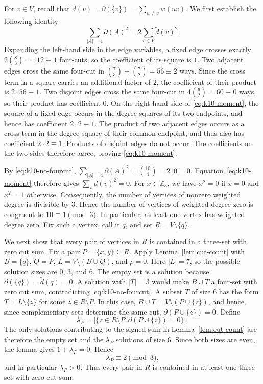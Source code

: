 ﻿\documentclass[11pt]{article}
\numberwithin{equation}{section}
\theoremstyle{remark}
\newcommand{\Z}{\mathbb Z}
\newcommand{\td}{\tilde{d}}
\begin{document}
For $v\in V$, recall that $\td(v)=\partial(\{v\})=\sum_{u\ne v}w(uv)$.  We first establish the following identity
\begin{equation}\label{eq:k10-moment}
    \sum_{|A|=4}\partial(A)^2=2\sum_{v\in V}\td(v)^2.
\end{equation}
Expanding the left-hand side in the edge variables, a fixed edge crosses exactly
\(2\binom{8}{3}=112\equiv 1\)
four-cuts, so the coefficient of its square is \(1\). Two adjacent edges cross the same four-cut in
\(\binom{7}{3}+\binom{7}{2}=56\equiv 2\)
ways. Since the cross term in a square carries an additional factor of \(2\), the coefficient of their product is
\(2\cdot 56\equiv 1.\)
Two disjoint edges cross the same four-cut in
\(4\binom{6}{2}=60\equiv 0\)
ways, so their product has coefficient \(0\).
On the right-hand side of \eqref{eq:k10-moment}, the square of a fixed edge occurs in the degree squares of its two endpoints, and hence has coefficient
\(2\cdot 2\equiv 1.\)
The product of two adjacent edges occurs as a cross term in the degree square of their common endpoint, and thus also has coefficient
\(2\cdot 2\equiv 1.\)
Products of disjoint edges do not occur. The coefficients on the two sides therefore agree, proving \eqref{eq:k10-moment}.

By \eqref{eq:k10-no-fourcut},
\(
\sum_{|A|=4}\partial(A)^2=\binom{10}{4}=210=0.
\)
Equation~\eqref{eq:k10-moment} therefore gives $\sum_v \td(v)^2=0$.  For \(x\in\Z_3\), we have \(x^2=0\) if \(x=0\) and \(x^2=1\) otherwise. Consequently, the number of vertices of nonzero weighted degree is divisible by \(3\). Hence the number of vertices of weighted degree zero is congruent to
\(10\equiv 1\pmod 3.\)
In particular, at least one vertex has weighted degree zero. Fix such a vertex, call it \(q\), and set
\(R=V\setminus\{q\}.\)


We next show that every pair of vertices in $R$ is contained in a three-set with zero cut sum.  Fix a pair $P=\{x,y\}\subseteq R$. Apply Lemma~\ref{lem:cut-count} with $B=\{q\}$, $Q=P$, $L=V\setminus(B\cup Q)$, and $\rho=0$.  Here $|L|=7$, so the possible solution sizes are $0$, $3$, and $6$.  The empty set is a solution because $\partial(\{q\})=\td(q)=0$.  A solution with $|T|=3$ would make $B \cup T$ a four-set with zero cut sum, contradicting \eqref{eq:k10-no-fourcut}.  A subset $T$ of size $6$ has the form $T=L\setminus\{z\}$ for some $z\in R\setminus P$. In this case, $B\cup T=V\setminus(P\cup\{z\})$, and hence, since complementary sets determine the same cut, $\partial(P\cup\{z\})=0$.  Define
\[
    \lambda_P=\bigl|\{z\in R\setminus P:\partial(P\cup\{z\})=0\}\bigr|,
\]
The only solutions contributing to the signed sum in Lemma~\ref{lem:cut-count} are therefore the empty set and the \(\lambda_P\) solutions of size \(6\). Since both sizes are even, the lemma gives $1+\lambda_P=0$.  Hence
\begin{equation}\label{eq:k10-pair-extension}
    \lambda_P\equiv2\pmod3,
\end{equation}
and in particular $\lambda_P>0$.  Thus every pair in $R$ is contained in at least one three-set with zero cut sum.
\end{document}
